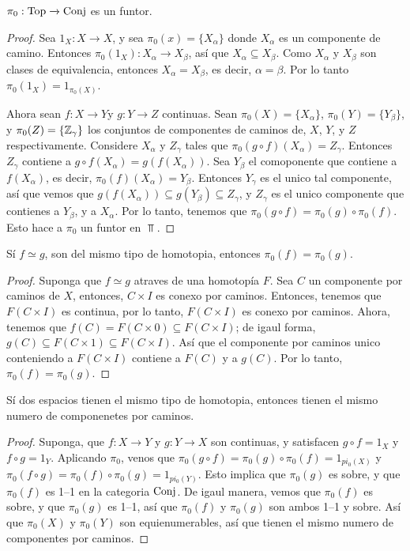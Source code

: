 \begin{theorem}\label{thm_9.20}
    $\pi_0:\operatorname{Top} \xrightarrow{} \operatorname{Conj}$ es un funtor.
\end{theorem}
\begin{proof}
    Sea $1_X:X \xrightarrow{} X$, y sea $\pi_0(x)=\{X_\alpha\}$ donde $X_\alpha$
    es un componente de camino. Entonces $\pi_0(1_X):X_\alpha \xrightarrow{}
    X_\beta$, as\'i que $X_\alpha \subseteq X_\beta$. Como  $X_\alpha$ y
    $X_\beta$ son clases de equivalencia, entonces  $X_\alpha=X_\beta$, es
    decir,  $\alpha=\beta$. Por lo tanto  $\pi_0(1_X)=1_{\pi_0(X)}$.

    Ahora sean $f:X \xrightarrow{} Y$y $g:Y \xrightarrow{} Z$ continuas. Sean
    $\pi_0(X)=\{X_\alpha\}$, $\pi_0(Y)=\{Y_\beta\}$, y $\pi_0(Z)=\{\mathbb{Z}_\gamma\}$
    los conjuntos de componentes de caminos de,  $X$,  $Y$, y  $Z$
    respectivamente. Considere  $X_\alpha$ y  $Z_\gamma$ tales que  $\pi_0(g
    \circ f)(X_\alpha)=Z_\gamma$. Entonces $Z_\gamma$ contiene a $g \circ
    f(X_\alpha)=g(f(X_\alpha))$. Sea $Y_\beta$ el comoponente que contiene a
    $f(X_\alpha)$, es decir, $\pi_0(f)(X_\alpha)=Y_\beta$. Entonces $Y_\gamma$
    es el unico tal componente, as\'i que vemos que
    $g(f(X_\alpha)) \subseteq g(Y_\beta) \subseteq Z_\gamma$, y $Z_\gamma$ es el
    unico componente que contienes a  $Y_\beta$, y a  $X_\alpha$. Por lo tanto,
    tenemos que $\pi_0(g \circ f)=\pi_0(g) \circ \pi_0(f)$. Esto hace a $\pi_0$
    un funtor en $\Top.$
\end{proof}
\begin{corollary}
    S\'i  $f \simeq g$, son del mismo tipo de homotopia, entonces  $\pi_0(f) = \pi_0(g)$.
\end{corollary}
\begin{proof}
    Suponga que $f \simeq g$ atraves de una homotop\'ia $F$. Sea $C$ un
    componente por caminos de  $X$, entonces,  $C \times I$ es conexo por
    caminos. Entonces, tenemos que $F(C \times I)$ es continua, por lo tanto,
    $F(C \times I)$ es conexo por caminos. Ahora, tenemos que $f(C)=F(C \times 0)
    \subseteq F(C \times I)$; de igaul forma, $g(C) \subseteq F(C \times 1)
    \subseteq F(C \times I)$. As\'i que el componente por caminos unico
    conteniendo a  $F(C \times I)$ contiene a $F(C)$ y a $g(C)$. Por lo tanto,
    $\pi_0(f)=\pi_0(g)$.
\end{proof}
\begin{corollary}
    S\'i dos espacios tienen el mismo tipo de homotopia, entonces tienen el
    mismo numero de componenetes por caminos.
\end{corollary}
\begin{proof}
    Suponga, que $f:X \xrightarrow{} Y$ y $g:Y \xrightarrow{} X$ son continuas,
    y satisfacen $g \circ f=1_X$ y  $f \circ g=1_Y$. Aplicando  $\pi_0$, venos
    que $\pi_0(g \circ f)=\pi_0(g) \circ \pi_0(f)=1_{pi_0(X)}$ y
    $\pi_0(f \circ g)=\pi_0(f) \circ \pi_0(g)=1_{pi_0(Y)}$. Esto implica que
    $\pi_0(g)$ es sobre, y que $\pi_0(f)$ es 1--1 en la categoria $\operatorname{Conj}$. De
    igaul manera, vemos que $\pi_0(f)$ es sobre, y que $\pi_0(g)$ es 1--1, as\'i
    que $\pi_0(f)$ y $\pi_0(g)$ son ambos 1--1 y sobre. As\'i que $\pi_0(X)$ y
    $\pi_0(Y)$ son equienumerables, as\'i que tienen el mismo numero de
    componentes por caminos.
\end{proof}

